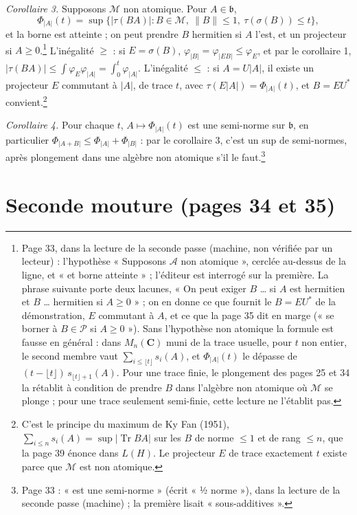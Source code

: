 \documentclass[11pt,a4paper]{article}
\begin{document}
\emph{Corollaire 3.} Supposons $\mathcal{M}$ non atomique. Pour $A \in
\mathfrak{b}$,
\[
  \Phi_{|A|}(t) = \sup\bigl\{ |\tau(BA)| : B \in \mathcal{M},\ \|B\| \leq 1,\   \tau(\sigma(B)) \leq t \bigr\},
\]
et la borne est atteinte ; on peut prendre $B$ hermitien si $A$ l'est, et un
projecteur si $A \geq 0$.\footnote{Page 33, dans la lecture de la seconde
passe (machine, non vérifiée par un lecteur) : l'hypothèse « Supposons
$\mathcal{A}$ non atomique », cerclée au-dessus de la ligne, et « et borne
atteinte » ; l'éditeur est interrogé sur la première. La phrase suivante
porte deux lacunes, « On peut exiger $B$ … si $A$ est hermitien et $B$ …
hermitien si $A \geq 0$ » ; on en donne ce que fournit le $B = EU^{*}$ de
la démonstration, $E$ commutant à $A$, et ce que la page 35 dit en marge
(« se borner à $B \in \mathcal{P}$ si $A \geq 0$ »). Sans l'hypothèse non
atomique la formule est fausse en général : dans $M_n(\mathbf{C})$ muni de
la trace usuelle, pour $t$ non entier, le second membre vaut $\sum_{i \leq
\lfloor t\rfloor} s_i(A)$, et $\Phi_{|A|}(t)$ le dépasse de $(t - \lfloor
t\rfloor)\,s_{\lfloor t\rfloor + 1}(A)$. Pour une trace finie, le plongement
des pages 25 et 34 la rétablit à condition de prendre $B$ dans l'algèbre non
atomique où $\mathcal{M}$ se plonge ; pour une trace seulement semi-finie,
cette lecture ne l'établit pas.}
L'inégalité $\geq$ : si $E = \sigma(B)$, $\varphi_{|B|} = \varphi_{|EB|} \leq
\varphi_E$, et par le corollaire 1, $|\tau(BA)| \leq \int \varphi_E
\varphi_{|A|} = \int_0^t \varphi_{|A|}$. L'inégalité $\leq$ : si $A = U|A|$,
il existe un projecteur $E$ commutant à $|A|$, de trace $t$, avec
$\tau(E|A|) = \Phi_{|A|}(t)$, et $B = EU^{*}$ convient.\footnote{C'est le
principe du maximum de Ky Fan (1951), $\sum_{i \leq n} s_i(A) = \sup
|\operatorname{Tr} BA|$ sur les $B$ de norme $\leq 1$ et de rang $\leq n$,
que la page 39 énonce dans $L(H)$. Le projecteur $E$ de trace exactement
$t$ existe parce que $\mathcal{M}$ est non atomique.}

\emph{Corollaire 4.} Pour chaque $t$, $A \mapsto \Phi_{|A|}(t)$ est une
semi-norme sur $\mathfrak{b}$, en particulier $\Phi_{|A+B|} \leq \Phi_{|A|} +
\Phi_{|B|}$ : par le corollaire 3, c'est un sup de semi-normes, après
plongement dans une algèbre non atomique s'il le faut.\footnote{Page 33 :
« est une semi-norme » (écrit « ½ norme »), dans la lecture de la seconde
passe (machine) ; la première lisait « sous-additives ».}

\section*{Seconde mouture (pages 34 et 35)}
\end{document}

